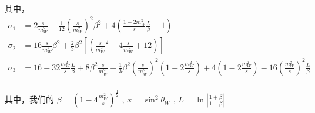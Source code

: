 \documentclass{article}
\begin{document}
其中，
\begin{align*}
    \sigma_1 &= 2 \frac{s}{m_W^2} + \frac{1}{12} \left(\frac{s}{m_W^2}\right)^2 \beta^2 + 4\left(\frac{1 - 2 m_W^2}{s}\frac{L}{\beta} - 1\right) \\
    \sigma_2 &= 16 \frac{s}{m_W^2}\beta^2 + \frac{2}{3} \beta^2 \left[\left(\frac{s}{m_W^2}^2 - 4\frac{s}{m_W^2} + 12\right)\right] \\
    \sigma_3 &= 16 - 32 \frac{m_W^2}{s} \frac{L}{\beta} + 8\beta^2 \frac{s}{m_W^2} + \frac{1}{3} \beta^2\left(\frac{s}{m_W^2}\right)^2 \left(1 - 2\frac{m_W^2}{s}\right) + 4\left(1 - 2\frac{m_W^2}{s}\right) - 16\left(\frac{m_W^2}{s}\right)^2\frac{L}{\beta} \\
\end{align*}

其中，我们的 $\displaystyle \beta = \left(1 - 4 \frac{m_W^2}{s}\right)^{\frac{1}{2}}$ , $\displaystyle x = \sin^2\theta_W$ , $\displaystyle L = \ln\left|\frac{1 + \beta}{1 - \beta}\right|$






\newpage

\begin{center}
    \nocite{Veltman_1994}
    \nocite{Peskin:1995ev}
    \nocite{Paschos_2023a}
    \nocite{griffiths2008introduction}
\end{center}
\end{document}
